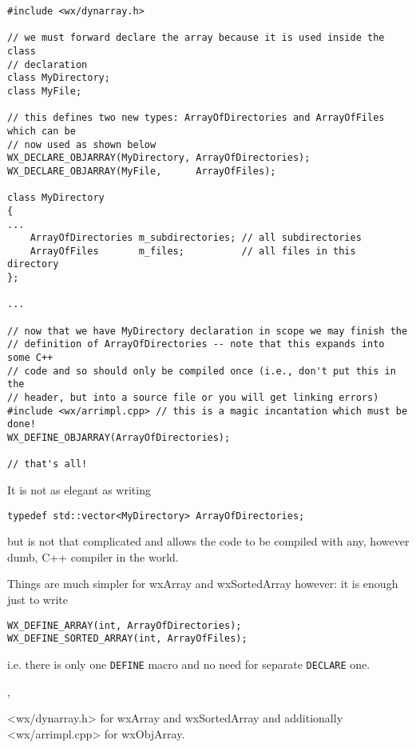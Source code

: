 \begin{verbatim}
#include <wx/dynarray.h>

// we must forward declare the array because it is used inside the class
// declaration
class MyDirectory;
class MyFile;

// this defines two new types: ArrayOfDirectories and ArrayOfFiles which can be
// now used as shown below
WX_DECLARE_OBJARRAY(MyDirectory, ArrayOfDirectories);
WX_DECLARE_OBJARRAY(MyFile,      ArrayOfFiles);

class MyDirectory
{
...
    ArrayOfDirectories m_subdirectories; // all subdirectories
    ArrayOfFiles       m_files;          // all files in this directory
};

...

// now that we have MyDirectory declaration in scope we may finish the
// definition of ArrayOfDirectories -- note that this expands into some C++
// code and so should only be compiled once (i.e., don't put this in the
// header, but into a source file or you will get linking errors)
#include <wx/arrimpl.cpp> // this is a magic incantation which must be done!
WX_DEFINE_OBJARRAY(ArrayOfDirectories);

// that's all!
\end{verbatim}

It is not as elegant as writing

\begin{verbatim} 
typedef std::vector<MyDirectory> ArrayOfDirectories;
\end{verbatim}

but is not that complicated and allows the code to be compiled with any, however
dumb, C++ compiler in the world.

Things are much simpler for wxArray and wxSortedArray however: it is enough
just to write

\begin{verbatim} 
WX_DEFINE_ARRAY(int, ArrayOfDirectories);
WX_DEFINE_SORTED_ARRAY(int, ArrayOfFiles);
\end{verbatim}

i.e. there is only one {\tt DEFINE} macro and no need for separate 
{\tt DECLARE} one.



, 


<wx/dynarray.h> for wxArray and wxSortedArray and additionally <wx/arrimpl.cpp>
for wxObjArray.

